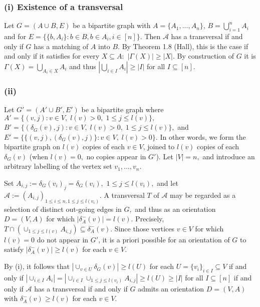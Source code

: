 \documentclass{article}
\begin{document}
  \subsubsection*{(i) Existence of a transversal}
  Let $G=(A\cup B, E)$ be a bipartite graph with $A=\{A_1,...,A_n\}$, $B=\bigcup_{i=1}^n A_i$ and for $E=\{\{b,A_i\}: b\in B, b\in A_i, i\in [n]\}$. Then $\mathcal A $ has a transversal if and only if $G$ has a matching of $A$ into $B$. By Theorem 1.8 (Hall), this is the case if and only if it satisfies for every $X\subseteq A:$ $|\Gamma(X)|\geq |X|$. By construction of $G$ it is $\Gamma(X)=\bigcup_{A_i\in X} A_i$ and thus $|\bigcup_{i\in I} A_i| \geq |I|$ for all $I \subseteq [n]$.

  \subsubsection*{(ii)} Let $G'=(A'\cup B', E')$ be a bipartite graph where $A'=\{(v,j):v\in V, \; l(v)>0,\; 1\leq j\leq l(v)\},$ $B'=\{(\delta_G(v),j):v\in V,\;l(v)>0,\; 1\leq j\leq l(v)\}, $ and $E'=\{\{(v,j),(\delta_G(v),j)\}:v\in V, \; l(v)>0\}.$ In other words, we form the bipartite graph on $l(v)$ copies of each $v\in V$, joined to $l(v)$ copies of each $\delta_G(v)$ (when $l(v)=0,$ no copies appear in $G'$). Let $|V|=n,$ and introduce an arbitrary labelling of the vertex set $v_1,\dots, v_n$.

  Set $A_{i,j}:=\delta_G(v_i)_j=\delta_G(v_i),$ $1\leq j\leq l(v_i),$ and let $\mathcal{A}:=(A_{i,j})_{1\leq i\leq n,1\leq j\leq l(v_i)}.$ A transversal $T$ of $\mathcal{A}$ may be regarded as a selection of distinct out-going edges in $G,$ and thus as an orientation $D=(V,A)$ for which $|\delta^-_A(v)|=l(v)$. Precisely, $T\cap (\cup_{1\leq j\leq l(v)} A_{i,j})\subseteq \delta^-_A(v) .$ Since those vertices $v\in V$ for which $l(v)=0$ do not appear in $G'$, it is a priori possible for an orientation of $G$ to satisfy $|\delta^-_A(v)| \geq l(v)$ for each $v \in V$.

  By (i), it follows that $|\cup_{v\in U} \delta_G(v)| \geq l(U)$ for each $U=\{v_i\}_{i\in I} \subseteq V$ if and only if $|\cup_{i\in I} A_i| =|\cup_{i\in I} \cup_{1\leq j\leq l(v_i)} A_{i,j}|\geq l(U) \geq |I|$ for all $I \subseteq [n]$ if and only if $\mathcal{A}$ has a transversal if and only if $G$ admits an orientation $D = (V, A)$ with $\delta^-_A(v) \geq l(v)$ for each $v \in V$.
\end{document}
